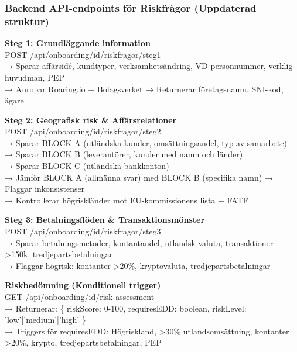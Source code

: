 \documentclass[10pt]{beamer}
\begin{document}
\begin{frame}[label=riskfragor-api]
  \frametitle{Backend API-endpoints för Riskfrågor (Uppdaterad struktur)}

  \footnotesize

  \textbf{Steg 1: Grundläggande information}\\
  \tiny POST /api/onboarding/{id}/riskfragor/steg1\\
  \tiny → Sparar affärsidé, kundtyper, verksamhetsändring, VD-personnummer, verklig huvudman, PEP\\
  \tiny → Anropar Roaring.io + Bolagsverket → Returnerar företagsnamn, SNI-kod, ägare

  \vspace{0.3cm}

  \textbf{Steg 2: Geografisk risk \& Affärsrelationer}\\
  \tiny POST /api/onboarding/{id}/riskfragor/steg2\\
  \tiny → Sparar BLOCK A (utländska kunder, omsättningsandel, typ av samarbete)\\
  \tiny → Sparar BLOCK B (leverantörer, kunder med namn och länder)\\
  \tiny → Sparar BLOCK C (utländska bankkonton)\\
  \tiny → Jämför BLOCK A (allmänna svar) med BLOCK B (specifika namn) → Flaggar inkonsistenser\\
  \tiny → Kontrollerar högriskländer mot EU-kommissionens lista + FATF

  \vspace{0.3cm}

  \textbf{Steg 3: Betalningsflöden \& Transaktionsmönster}\\
  \tiny POST /api/onboarding/{id}/riskfragor/steg3\\
  \tiny → Sparar betalningsmetoder, kontantandel, utländsk valuta, transaktioner >150k, tredjepartsbetalningar\\
  \tiny → Flaggar högrisk: kontanter >20\%, kryptovaluta, tredjepartsbetalningar

  \vspace{0.3cm}

  \textbf{Riskbedömning (Konditionell trigger)}\\
  \tiny GET /api/onboarding/{id}/risk-assessment\\
  \tiny → Returnerar: \{ riskScore: 0-100, requiresEDD: boolean, riskLevel: 'low'|'medium'|'high' \}\\
  \tiny → Triggers för requiresEDD: Högriskland, >30\% utlandsomsättning, kontanter >20\%, krypto, tredjepartsbetalningar, PEP


\end{frame}
\end{document}
